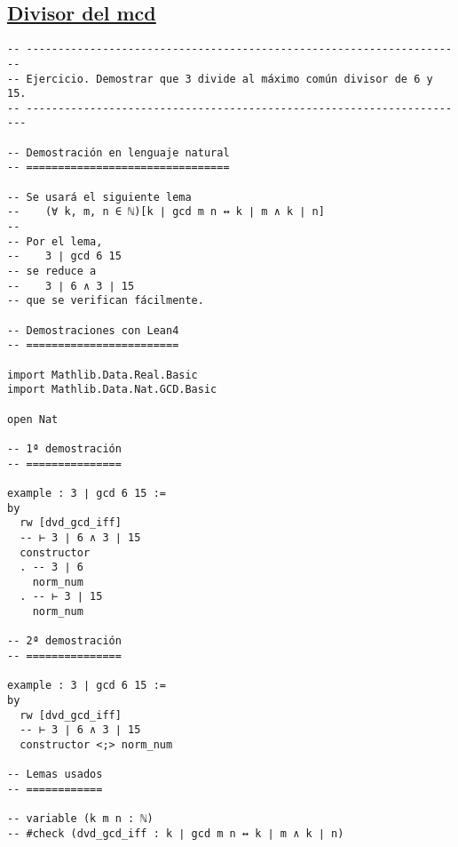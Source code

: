 \subsection{\href{./src/Logica/Divisor\_del\_mcd.lean}{Divisor del mcd}}
\label{sec:orgf014ddb}
\begin{verbatim}
-- ---------------------------------------------------------------------
-- Ejercicio. Demostrar que 3 divide al máximo común divisor de 6 y 15.
-- ----------------------------------------------------------------------

-- Demostración en lenguaje natural
-- ================================

-- Se usará el siguiente lema
--    (∀ k, m, n ∈ ℕ)[k ∣ gcd m n ↔ k ∣ m ∧ k ∣ n]
--
-- Por el lema,
--    3 ∣ gcd 6 15
-- se reduce a
--    3 ∣ 6 ∧ 3 ∣ 15
-- que se verifican fácilmente.

-- Demostraciones con Lean4
-- ========================

import Mathlib.Data.Real.Basic
import Mathlib.Data.Nat.GCD.Basic

open Nat

-- 1ª demostración
-- ===============

example : 3 ∣ gcd 6 15 :=
by
  rw [dvd_gcd_iff]
  -- ⊢ 3 ∣ 6 ∧ 3 ∣ 15
  constructor
  . -- 3 ∣ 6
    norm_num
  . -- ⊢ 3 ∣ 15
    norm_num

-- 2ª demostración
-- ===============

example : 3 ∣ gcd 6 15 :=
by
  rw [dvd_gcd_iff]
  -- ⊢ 3 ∣ 6 ∧ 3 ∣ 15
  constructor <;> norm_num

-- Lemas usados
-- ============

-- variable (k m n : ℕ)
-- #check (dvd_gcd_iff : k ∣ gcd m n ↔ k ∣ m ∧ k ∣ n)
\end{verbatim}


